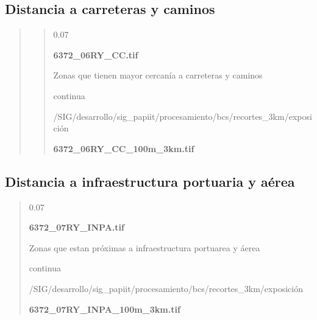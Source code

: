 \documentclass[letterpaper,10pt,spanish]{sphinxmanual}
\begin{document}
\subsection{Distancia a carreteras y caminos}
\label{\detokenize{exposicion_bcs:distancia-a-carreteras-y-caminos}}\begin{quote}

\begin{quote}

 0.07

 {\color{red}\bfseries{}\textbar{}6372\_06RY\_CC.tif\textbar{}}

 Zonas que tienen mayor cercanía a carreteras y caminos

 continua


 /SIG/desarrollo/sig\_papiit/procesamiento/bcs/recortes\_3km/exposición

  {\color{red}\bfseries{}\textbar{}6372\_06RY\_CC\_100m\_3km.tif\textbar{}}
\begin{quote}

\end{quote}
\end{quote}
\end{quote}


\subsection{Distancia a infraestructura portuaria y aérea}
\label{\detokenize{exposicion_bcs:distancia-a-infraestructura-portuaria-y-aerea}}
\begin{quote}

 0.07

 {\color{red}\bfseries{}\textbar{}6372\_07RY\_INPA.tif\textbar{}}

 Zonas que estan próximas a infraestructura portuarea y áerea

 continua


 /SIG/desarrollo/sig\_papiit/procesamiento/bcs/recortes\_3km/exposición

  {\color{red}\bfseries{}\textbar{}6372\_07RY\_INPA\_100m\_3km.tif\textbar{}}
\begin{quote}

\end{quote}
\end{quote}
\end{document}
